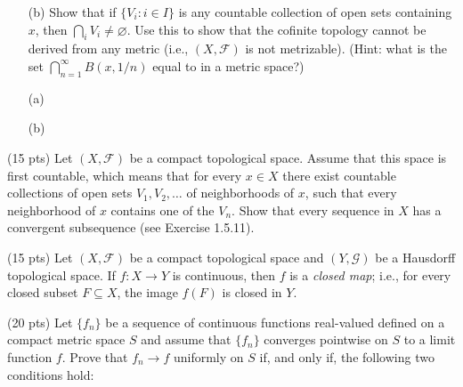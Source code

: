 \documentclass[addpoints]{exam}
\theoremstyle{definition}
\begin{document}
\begin{CJK*}{UTF8}{gbsn}
\begin{questions}
\begin{enumerate}
\item[(b)] 
Show that if $\{V_i : i \in I\}$ is any countable collection of open sets containing $x$, then $\bigcap_i V_i \neq \varnothing$.  
Use this to show that the cofinite topology cannot be derived from any metric (i.e., $(X, \mathcal{F})$ is not metrizable).  
(Hint: what is the set $\bigcap_{n=1}^\infty B(x, 1/n)$ equal to in a metric space?)

\end{enumerate}

\begin{solution}

\begin{enumerate}
\item[(a)] 



\bigskip
\item[(b)] 




\end{enumerate} 
\end{solution}

\question (15 pts) 	
Let $(X, \mathcal{F})$ be a compact topological space.  
Assume that this space is first countable, which means that for every $x \in X$ there exist countable collections of open sets $V_1, V_2, \ldots$ of neighborhoods of $x$, such that every neighborhood of $x$ contains one of the $V_n$.  
Show that every sequence in $X$ has a convergent subsequence
 (see Exercise 1.5.11).


\begin{solution} 
 
 \end{solution}

\question (15 pts) Let $(X,\mathcal{F})$ be a compact topological space and $(Y,\mathcal{G})$ be a Hausdorff topological space. 
If $f:X\to Y$ is continuous, then $f$ is a \emph{closed map}; i.e., for every closed
subset $F\subseteq X$, the image $f(F)$ is closed in $Y$.



\begin{solution} 

\end{solution}

\question (20 pts)
Let $\{f_n\}$ be a sequence of continuous functions real-valued defined on a compact metric space $S$ and assume that $\{f_n\}$ converges pointwise on $S$ to a limit function $f$.  
Prove that $f_n \to f$ uniformly on $S$ if, and only if, the following two conditions hold:


\end{questions}
\end{CJK*}
\end{document}
